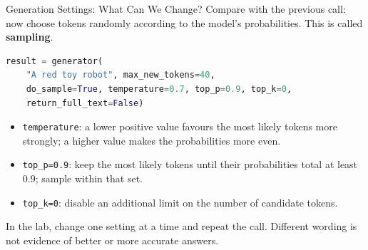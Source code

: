 \documentclass[aspectratio=169]{beamer}
\begin{document}
\begin{frame}[fragile]{Generation Settings: What Can We Change?}
  \small Compare with the previous call: now choose tokens randomly according to the model's probabilities. This is called \textbf{sampling}.
  \begin{lstlisting}[language=Python]
result = generator(
    "A red toy robot", max_new_tokens=40,
    do_sample=True, temperature=0.7, top_p=0.9, top_k=0,
    return_full_text=False)
  \end{lstlisting}
  \begin{itemize}
    \item \texttt{temperature}: a lower positive value favours the most likely tokens more strongly; a higher value makes the probabilities more even.
    \item \texttt{top\_p=0.9}: keep the most likely tokens until their probabilities total at least $0.9$; sample within that set.
    \item \texttt{top\_k=0}: disable an additional limit on the number of candidate tokens.
  \end{itemize}
  \small In the lab, change one setting at a time and repeat the call. Different wording is not evidence of better or more accurate answers.
\end{frame}
\end{document}

